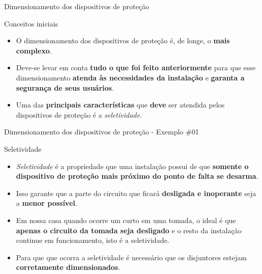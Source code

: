 \begin{frame}{Dimensionamento dos dispositivos de proteção}
	\begin{block}{Conceitos iniciais}
		\begin{itemize}
			\item O dimensionamento dos dispositivos de proteção é, de longe, o \textbf{mais complexo}.
			\item Deve-se levar em conta \textbf{tudo o que foi feito anteriormente} para que esse dimensionamento \textbf{atenda às necessidades da instalação }e \textbf{garanta a segurança de seus usuários}.
			\item Uma das \textbf{principais características} que \textbf{deve }ser atendida pelos dispositivos de proteção é a \textit{seletividade}.
		\end{itemize}
	\end{block}
\end{frame}


\begin{frame}{Dimensionamento dos dispositivos de proteção - Exemplo \#01}
	\begin{block}{Seletividade}
		\begin{itemize}
			\item \textit{Seletividade} é a propriedade que uma instalação possui de que \textbf{somente o dispositivo de proteção mais próximo do ponto de falta se desarma}.
			\item Isso garante que a parte do circuito que ficará \textbf{desligada e inoperante} seja a \textbf{menor possível}.
			\item Em nossa casa quando ocorre um curto em uma tomada, o ideal é que \textbf{apenas o circuito da tomada seja desligado }e o resto da instalação continue em funcionamento, isto é a seletividade.
			\item Para que que ocorra a seletividade é necessário que os disjuntores estejam \textbf{corretamente dimensionados}.
		\end{itemize}
	\end{block}
\end{frame}



